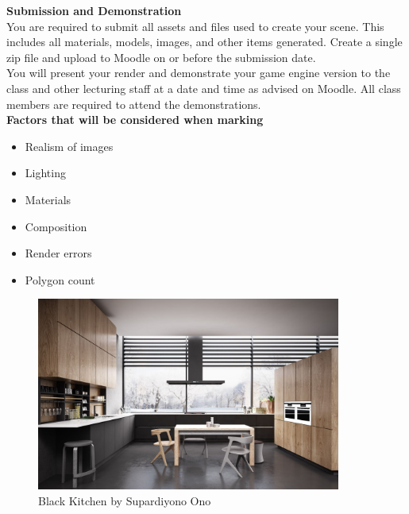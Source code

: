 \textbf{Submission and Demonstration}\\

You are required to submit all assets and files used to create your scene.  This includes all materials, models, images, and other items generated.  Create a single zip file and upload to Moodle on or before the submission date.\\

You will present your render and demonstrate your game engine version to the class and other lecturing staff at a date and time as advised on Moodle.  All class members are required to attend the demonstrations.\\





\textbf{Factors that will be considered when marking}\\
\begin{itemize}
	\item Realism of images
	\item Lighting
	\item Materials
	\item Composition
	\item Render errors
	\item Polygon count
\end{itemize}



\begin{figure}
	\centering
		\includegraphics[width=10cm]{img/blackKitchen.jpg}
	\caption{Black Kitchen by Supardiyono Ono}
	\label{fig:1}
\end{figure}



